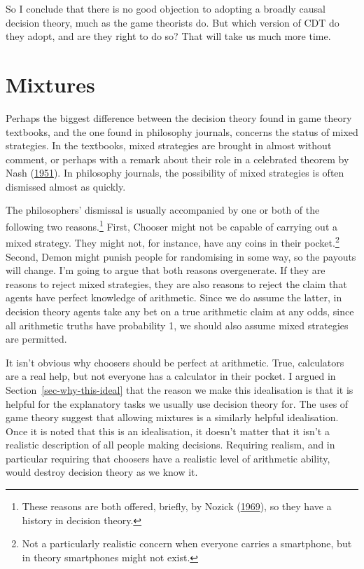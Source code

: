 \documentclass[
  12pt,
  letterpaper,
  DIV=11,
  numbers=noendperiod]{scrreprt}
\begin{document}
So I conclude that there is no good objection to adopting a broadly
causal decision theory, much as the game theorists do. But which version
of CDT do they adopt, and are they right to do so? That will take us
much more time.


\hypertarget{sec-mixed}{%
\chapter{Mixtures}\label{sec-mixed}}

Perhaps the biggest difference between the decision theory found in game
theory textbooks, and the one found in philosophy journals, concerns the
status of mixed strategies. In the textbooks, mixed strategies are
brought in almost without comment, or perhaps with a remark about their
role in a celebrated theorem by Nash
(\protect\hyperlink{ref-Nash1951}{1951}). In philosophy journals, the
possibility of mixed strategies is often dismissed almost as quickly.

The philosophers' dismissal is usually accompanied by one or both of the
following two reasons.\footnote{These reasons are both offered, briefly,
  by Nozick (\protect\hyperlink{ref-Nozick1969}{1969}), so they have a
  history in decision theory.} First, Chooser might not be capable of
carrying out a mixed strategy. They might not, for instance, have any
coins in their pocket.\footnote{Not a particularly realistic concern
  when everyone carries a smartphone, but in theory smartphones might
  not exist.} Second, Demon might punish people for randomising in some
way, so the payouts will change. I'm going to argue that both reasons
overgenerate. If they are reasons to reject mixed strategies, they are
also reasons to reject the claim that agents have perfect knowledge of
arithmetic. Since we do assume the latter, in decision theory agents
take any bet on a true arithmetic claim at any odds, since all
arithmetic truths have probability 1, we should also assume mixed
strategies are permitted.

It isn't obvious why choosers should be perfect at arithmetic. True,
calculators are a real help, but not everyone has a calculator in their
pocket. I argued in Section~\ref{sec-why-this-ideal} that the reason we
make this idealisation is that it is helpful for the explanatory tasks
we usually use decision theory for. The uses of game theory suggest that
allowing mixtures is a similarly helpful idealisation. Once it is noted
that this is an idealisation, it doesn't matter that it isn't a
realistic description of all people making decisions. Requiring realism,
and in particular requiring that choosers have a realistic level of
arithmetic ability, would destroy decision theory as we know it.
\end{document}
